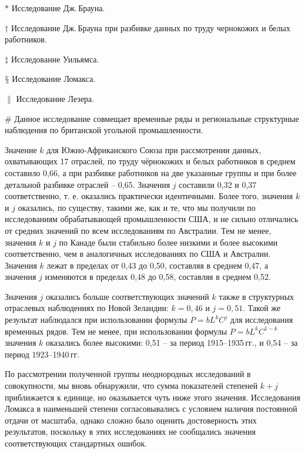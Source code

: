 \documentclass{article}
\begin{document}
\begin{table}[!t]
{\begin{tabular}{p{}p{}p{}p{}p{}p{}p{}p{0pt}}
\bottomrule
\end{tabular}
\raggedright{
\par
$\ast$ Исследование Дж.\,Брауна.
\par
$\dagger$ Исследование Дж.\,Брауна при разбивке данных по труду чернокожих и белых работников.
\par
$\ddagger$ Исследование Уильямса.
\par
$\mathsection$ Исследование Ломакса.
\par
$\|$ Исследование Лезера.
\begin{flushleft}
$\#$ Данное исследование совмещает временные ряды и региональные структурные наблюдения по британской угольной промышленности.
\end{flushleft}
}
}
\end{table}

Значение \(k\) для Южно-Африканского Союза при рассмотрении данных, охватывающих 17 отраслей, по труду чёрнокожих и белых работников в среднем составило 0,66, а при разбивке работников на две указанные группы и при более детальной разбивке отраслей -- 0,65. Значения \(j\) составили 0,32 и 0,37 соответственно, т. е. оказались практически идентичными. Более того, значения \(k\) и \(j\) оказались, по существу, такими же, как и те, что мы получили по исследованиям обрабатывающей промышленности США, и не сильно отличались от средних значений по всем исследованиям по Австралии. Тем не менее, значения \(k\) и \(j\) по Канаде были стабильно более низкими и более высокими соответственно, чем в аналогичных исследованиях по США и Австралии. Значения \(k\) лежат в пределах от 0,43 до 0,50, составляя в среднем 0,47, а значения \(j\) изменяются в пределах 0,48 до 0,58, составляя в среднем 0,52.

Значения \(j\) оказались больше соответствующих значений \(k\) также в структурных отраслевых наблюдениях по Новой Зеландии: \(k = 0{,}46\) и \(j = 0{,}51\). Такой же результат наблюдался при использовании формулы \(P=bL^kC^j\) для исследования временных рядов. Тем не менее, при использовании формулы \(P=bL^kC^{1-k}\) значения \(k\) оказались более высокими: 0,51 -- за период 1915--1935\,гг., и 0,54 -- за период 1923--1940\,гг.

По рассмотрении полученной группы неоднородных исследований в совокупности, мы вновь обнаружили, что сумма показателей степеней \(k + j\) приближается к единице, но оказывается чуть ниже этого значения. Исследования Ломакса в наименьшей степени согласовывались с условием наличия постоянной отдачи от масштаба, однако сложно было оценить достоверность этих результатов, поскольку в этих исследованиях не сообщались значения соответствующих стандартных ошибок.
\end{document}
